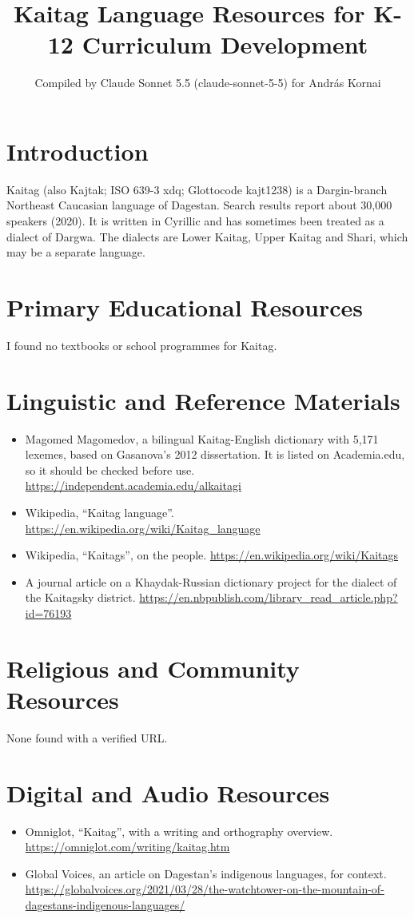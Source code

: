 \documentclass[12pt]{article}
\title{Kaitag Language Resources for K-12 Curriculum Development}
\author{Compiled by Claude Sonnet 5.5 (claude-sonnet-5-5) for Andr\'as Kornai}
\date{}
\begin{document}
\maketitle

\section{Introduction}
Kaitag (also Kajtak; ISO 639-3 xdq; Glottocode kajt1238) is a Dargin-branch Northeast Caucasian language of Dagestan. Search results report about 30,000 speakers (2020). It is written in Cyrillic and has sometimes been treated as a dialect of Dargwa. The dialects are Lower Kaitag, Upper Kaitag and Shari, which may be a separate language.

\section{Primary Educational Resources}
I found no textbooks or school programmes for Kaitag.

\section{Linguistic and Reference Materials}
\begin{itemize}
\item Magomed Magomedov, a bilingual Kaitag-English dictionary with 5,171 lexemes, based on Gasanova's 2012 dissertation. It is listed on Academia.edu, so it should be checked before use. \url{https://independent.academia.edu/alkaitagi}
\item Wikipedia, ``Kaitag language''. \url{https://en.wikipedia.org/wiki/Kaitag_language}
\item Wikipedia, ``Kaitags'', on the people. \url{https://en.wikipedia.org/wiki/Kaitags}
\item A journal article on a Khaydak-Russian dictionary project for the dialect of the Kaitagsky district. \url{https://en.nbpublish.com/library_read_article.php?id=76193}
\end{itemize}

\section{Religious and Community Resources}
None found with a verified URL.

\section{Digital and Audio Resources}
\begin{itemize}
\item Omniglot, ``Kaitag'', with a writing and orthography overview. \url{https://omniglot.com/writing/kaitag.htm}
\item Global Voices, an article on Dagestan's indigenous languages, for context. \url{https://globalvoices.org/2021/03/28/the-watchtower-on-the-mountain-of-dagestans-indigenous-languages/}
\end{itemize}
\end{document}
